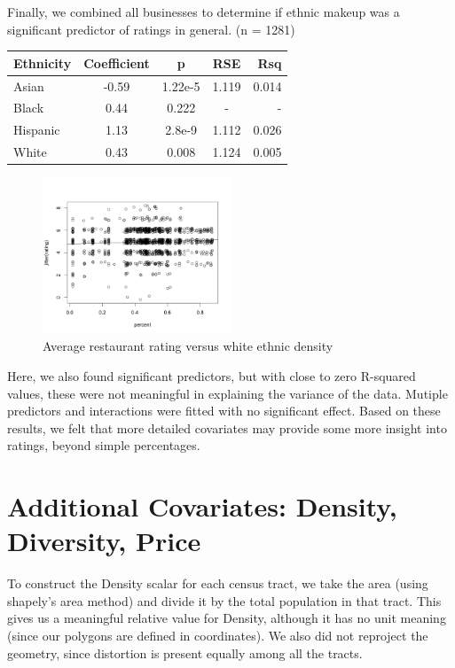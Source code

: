 \documentclass[11pt,twocolumn]{article}
\begin{document}
Finally, we combined all businesses to determine if ethnic makeup was a significant predictor of ratings in general. (n = 1281)

\begin{center}
  \begin{tabular}{| l | c | c | c | r | }
    \hline
    Ethnicity & Coefficient & p & RSE & Rsq \\ \hline \hline
    Asian & -0.59 & 1.22e-5 & 1.119 & 0.014 \\ \hline
    Black & 0.44 & 0.222 & - & - \\ \hline
    Hispanic & 1.13 & 2.8e-9 & 1.112 & 0.026 \\ \hline
    White & 0.43 & 0.008 & 1.124 & 0.005 \\ \hline
  \end{tabular}
\end{center}

\begin{figure}[h!]
  \caption{Average restaurant rating versus white ethnic density}
  \centering
  \includegraphics[width=0.5\textwidth]{whitepeople_presentation}
\end{figure}


Here, we also found significant predictors, but with close to zero R-squared values, these were not meaningful in explaining the variance of the data. Mutiple predictors and interactions were fitted with no significant effect. Based on these results, we felt that more detailed covariates may provide some more insight into ratings, beyond simple percentages.

\section{Additional Covariates: Density, Diversity, Price}

To construct the Density scalar for each census tract, we take the area (using shapely's area method) and divide it by the total population in that tract. This gives us a meaningful relative value for Density, although it has no unit meaning (since our polygons are defined in coordinates). We also did not reproject the geometry, since distortion is present equally among all the tracts.
\end{document}
